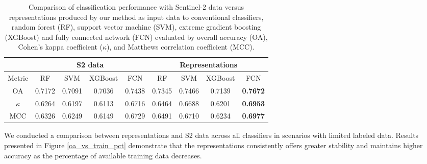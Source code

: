 \documentclass[journal,article,submit,pdftex,moreauthors]{Definitions/mdpi}
\begin{document}

\begin{table}[H]
    \centering
    \caption{Comparison of classification performance with Sentinel-2 data versus representations produced by our method as input data to conventional classifiers, random forest (RF), support vector machine (SVM), extreme gradient boosting (XGBoost) and fully connected network (FCN) evaluated by overall accuracy (OA), Cohen’s kappa coefficient ($\kappa$), and Matthews correlation coefficient (MCC).}
    \begin{tabular}{c|c c c c| c c c c}
    \hline 
        & \multicolumn{4}{c|}{S2 data} & \multicolumn{4}{c}{Representations}\\ \hline
        Metric &    RF  &   SVM  &   XGBoost &   FCN    &    RF   &   SVM     &   XGBoost &   FCN \\ \hline
         OA   & 0.7172 & 0.7091 &   0.7036  &  0.7438  &  0.7345 &   0.7466  &   0.7139  & \textbf{0.7672}\\ 
         $\kappa$    & 0.6264 & 0.6197 &   0.6113  &  0.6716  &  0.6464 &   0.6688  &   0.6201  & \textbf{0.6953}\\ 
         MCC   & 0.6326 & 0.6249 &   0.6149  &  0.6729  &  0.6491 &   0.6710  &   0.6234  & \textbf{0.6977} \\ \hline
    \end{tabular}
    \label{Classification_performance_evaluation_conventional_classifiers}
\end{table}

We conducted a comparison between representations and S2 data across all classifiers in scenarios with limited labeled data. Results presented in Figure \ref{oa_vs_train_pct} demonstrate that the representations consistently offers greater stability and maintains higher accuracy as the percentage of available training data decreases.
\end{document}

